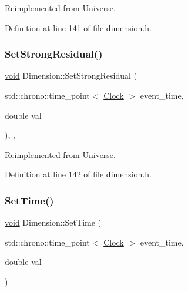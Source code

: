 Reimplemented from \mbox{\hyperlink{class_universe_aafec97a231126b71c73ac1258609a284}{Universe}}.



Definition at line 141 of file dimension.\+h.

\mbox{\label{class_dimension_a9bd5480b1da689cd58bf61dac7169080}} 
\subsubsection{\texorpdfstring{Set\+Strong\+Residual()}{SetStrongResidual()}}
{\footnotesize\ttfamily \mbox{\hyperlink{glad_8h_a950fc91edb4504f62f1c577bf4727c29}{void}} Dimension\+::\+Set\+Strong\+Residual (\begin{DoxyParamCaption}\item[{std\+::chrono\+::time\+\_\+point$<$ \mbox{\hyperlink{universe_8h_a0ef8d951d1ca5ab3cfaf7ab4c7a6fd80}{Clock}} $>$}]{event\+\_\+time,  }\item[{double}]{val }\end{DoxyParamCaption})\hspace{0.3cm}{\ttfamily [inline]}, {\ttfamily [final]}, {\ttfamily [virtual]}}



Reimplemented from \mbox{\hyperlink{class_universe_a1b2d6197ddf3d613cc30bd04d22ed8b7}{Universe}}.



Definition at line 142 of file dimension.\+h.

\mbox{\label{class_dimension_a0558d45fe020ba1d1895e521a411decb}} 
\subsubsection{\texorpdfstring{Set\+Time()}{SetTime()}}
{\footnotesize\ttfamily \mbox{\hyperlink{glad_8h_a950fc91edb4504f62f1c577bf4727c29}{void}} Dimension\+::\+Set\+Time (\begin{DoxyParamCaption}\item[{std\+::chrono\+::time\+\_\+point$<$ \mbox{\hyperlink{universe_8h_a0ef8d951d1ca5ab3cfaf7ab4c7a6fd80}{Clock}} $>$}]{event\+\_\+time,  }\item[{double}]{val }\end{DoxyParamCaption})}



